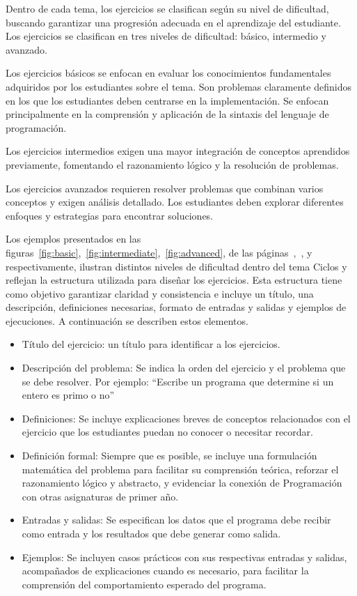 \documentclass{article}
\begin{document}
Dentro de cada tema, los ejercicios se clasifican según su nivel de dificultad, buscando garantizar una progresión adecuada en el aprendizaje del estudiante. Los ejercicios se clasifican en tres niveles de dificultad: básico, intermedio y avanzado.

Los ejercicios básicos se enfocan en evaluar los conocimientos fundamentales adquiridos por los estudiantes sobre el tema. Son problemas claramente definidos en los que los estudiantes deben centrarse en la implementación. Se enfocan principalmente en la comprensión y aplicación de la sintaxis del lenguaje de programación.

Los ejercicios intermedios exigen una mayor integración de conceptos aprendidos previamente, fomentando el razonamiento lógico y la resolución de problemas.

Los ejercicios avanzados requieren resolver problemas que combinan varios conceptos y exigen análisis detallado. Los estudiantes deben explorar diferentes enfoques y estrategias para encontrar soluciones.

Los ejemplos presentados en las figuras~\ref{fig:basic},~\ref{fig:intermediate},~\ref{fig:advanced}, de las páginas~\pageref{fig:basic},~\pageref{fig:intermediate}, y~\pageref{fig:advanced} respectivamente, ilustran distintos niveles de dificultad dentro del tema Ciclos y reflejan la estructura utilizada para diseñar los ejercicios. Esta estructura tiene como objetivo garantizar claridad y consistencia e incluye un título, una descripción, definiciones necesarias, formato de entradas y salidas y ejemplos de ejecuciones. A continuación se describen estos elementos.

\begin{itemize}
    \item Título del ejercicio: un título para identificar a los ejercicios.
    
    \item Descripción del problema:  
    Se indica la orden del ejercicio y el problema que se debe resolver. Por ejemplo: ``Escribe un programa que determine si un entero es primo o no''

    \item Definiciones: 
    Se incluye explicaciones breves de conceptos relacionados con el ejercicio que los estudiantes puedan no conocer o necesitar recordar.

    \item Definición formal:
    Siempre que es posible, se incluye una formulación matemática del problema para facilitar su comprensión teórica, reforzar el razonamiento lógico y abstracto, y evidenciar la conexión de Programación con otras asignaturas de primer año.
    
    \item Entradas y salidas:
    Se especifican los datos que el programa debe recibir como entrada y los resultados que debe generar como salida.

    \item Ejemplos:
    Se incluyen casos prácticos con sus respectivas entradas y salidas, acompañados de explicaciones cuando es necesario, para facilitar la comprensión del comportamiento esperado del programa.
\end{itemize}
\end{document}
